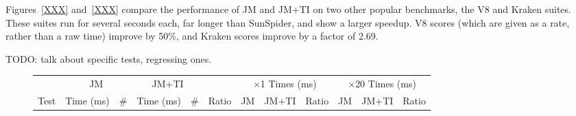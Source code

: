 Figures~\ref{XXX} and~\ref{XXX} compare the performance of JM and JM+TI
on two other popular benchmarks, the V8 \cite{XXX} and Kraken \cite{XXX} suites.
These suites run for several seconds each, far longer than SunSpider,
and show a larger speedup.
V8 scores (which are given as a rate, rather than a raw time) improve by 50\%,
and Kraken scores improve by a factor of 2.69.

TODO: talk about specific tests, regressing ones.

\begin{figure*}
\begin{center}
\begin{tabular}{lr@{.}lrr@{.}lrr@{.}lr@{.}lr@{.}lr@{.}lr@{.}lr@{.}lr@{.}l}

\toprule

           & \multicolumn{3}{c}{JM}
           & \multicolumn{3}{c}{JM+TI}
           & \multicolumn{2}{c}{}
           & \multicolumn{6}{c}{$\times$1 Times (ms)}
           & \multicolumn{6}{c}{$\times$20 Times (ms)} \\

\cmidrule(r){2-4}
\cmidrule{5-7}
\cmidrule(r){10-15}
\cmidrule{16-21}

Test       & \multicolumn{2}{c}{Time (ms)} & \#
           & \multicolumn{2}{c}{Time (ms)} & \#
           & \multicolumn{2}{c}{Ratio}
           & \multicolumn{2}{c}{JM}
           & \multicolumn{2}{c}{JM+TI}
           & \multicolumn{2}{c}{Ratio}
           & \multicolumn{2}{c}{JM}
           & \multicolumn{2}{c}{JM+TI}
           & \multicolumn{2}{c}{Ratio} \\

\midrule


\end{tabular}
\end{center}
\end{figure*}
